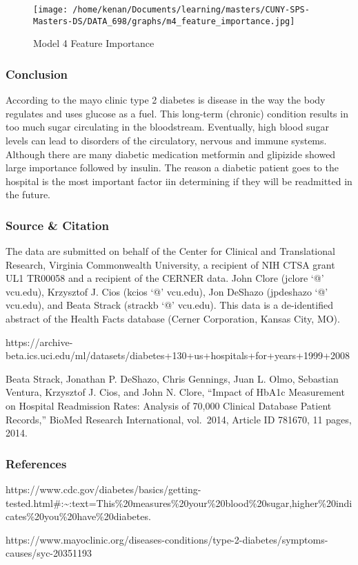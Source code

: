 \documentclass[5p]{elsarticle} %
\begin{document}
\begin{figure}
\hypertarget{id}{%
\centering
\texttt{[image: /home/kenan/Documents/learning/masters/CUNY-SPS-Masters-DS/DATA\_698/graphs/m4\_feature\_importance.jpg]}
\caption{Model 4 Feature Importance}\label{id}
}
\end{figure}

\clearpage
\twocolumn

\hypertarget{conclusion}{%
\subsubsection{Conclusion}\label{conclusion}}

According to the mayo clinic type 2 diabetes is disease in the way the
body regulates and uses glucose as a fuel. This long-term (chronic)
condition results in too much sugar circulating in the bloodstream.
Eventually, high blood sugar levels can lead to disorders of the
circulatory, nervous and immune systems. Although there are many
diabetic medication metformin and glipizide showed large importance
followed by insulin. The reason a diabetic patient goes to the hospital
is the most important factor iin determining if they will be readmitted
in the future.

\hypertarget{source-citation}{%
\subsubsection{Source \& Citation}\label{source-citation}}

The data are submitted on behalf of the Center for Clinical and
Translational Research, Virginia Commonwealth University, a recipient of
NIH CTSA grant UL1 TR00058 and a recipient of the CERNER data. John
Clore (jclore `@' vcu.edu), Krzysztof J. Cios (kcios `@' vcu.edu), Jon
DeShazo (jpdeshazo `@' vcu.edu), and Beata Strack (strackb `@' vcu.edu).
This data is a de-identified abstract of the Health Facts database
(Cerner Corporation, Kansas City, MO).

https://archive-beta.ics.uci.edu/ml/datasets/diabetes+130+us+hospitals+for+years+1999+2008

Beata Strack, Jonathan P. DeShazo, Chris Gennings, Juan L. Olmo,
Sebastian Ventura, Krzysztof J. Cios, and John N. Clore, ``Impact of
HbA1c Measurement on Hospital Readmission Rates: Analysis of 70,000
Clinical Database Patient Records,'' BioMed Research International,
vol.~2014, Article ID 781670, 11 pages, 2014.

\hypertarget{references}{%
\subsubsection{References}\label{references}}

https://www.cdc.gov/diabetes/basics/getting-tested.html\#:\textasciitilde:text=This\%20measures\%20your\%20blood\%20sugar,higher\%20indicates\%20you\%20have\%20diabetes.

https://www.mayoclinic.org/diseases-conditions/type-2-diabetes/symptoms-causes/syc-20351193
\end{document}
